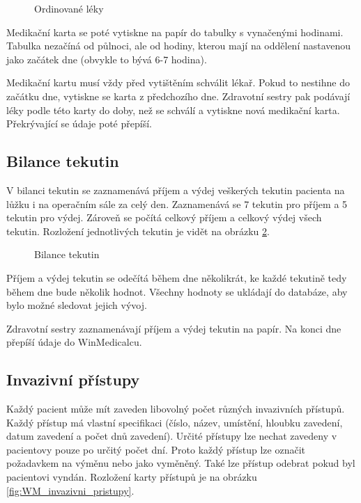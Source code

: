 \begin{figure}[h]
	\centering
	\caption{Ordinované léky}
  \label{fig:WM_ordinovane_leky}
\end{figure}

Medikační karta se poté vytiskne na papír do tabulky s vynačenými hodinami. Tabulka nezačíná od půlnoci, ale od hodiny, kterou mají na oddělení nastavenou jako začátek dne (obvykle to bývá 6-7 hodina).

Medikační kartu musí vždy před vytištěním schválit lékař. Pokud to nestihne do začátku dne, vytiskne se karta z předchozího dne. Zdravotní sestry pak podávají léky podle této karty do doby, než se schválí a vytiskne nová medikační karta. Překrývající se údaje poté přepíší.

\subsection{Bilance tekutin}

V bilanci tekutin se zaznamenává příjem a výdej veškerých tekutin pacienta na lůžku i na operačním sále za celý den. Zaznamenává se 7 tekutin pro příjem a 5 tekutin pro výdej. Zároveň se počítá celkový příjem a celkový výdej všech tekutin. Rozložení jednotlivých tekutin je vidět na obrázku \ref{fig:WM_bilance_tekutin}.

\begin{figure}[h]
	\centering
	\caption{Bilance tekutin}
  \label{fig:WM_bilance_tekutin}
\end{figure}


Příjem a výdej tekutin se odečítá během dne několikrát, ke každé tekutině tedy během dne bude několik hodnot. Všechny hodnoty se ukládají do databáze, aby bylo možné sledovat jejich vývoj.

Zdravotní sestry zaznamenávají příjem a výdej tekutin na papír. Na konci dne přepíší údaje do WinMedicalcu.

\subsection{Invazivní přístupy}

Každý pacient může mít zaveden libovolný počet různých invazivních přístupů. Každý přístup má vlastní specifikaci (číslo, název, umístění, hloubku zavedení, datum zavedení a počet dnů zavedení). Určité přístupy lze nechat zavedeny v pacientovy pouze po určitý počet dní. Proto každý přístup lze označit požadavkem na výměnu nebo jako vyměněný. Také lze přístup odebrat pokud byl pacientovi vyndán. Rozložení karty přístupů je na obrázku \ref{fig:WM_invazivni_pristupy}.

